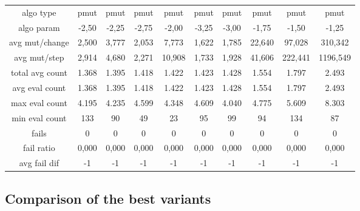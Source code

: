 \begin{tabular}[h]{cccccccccc}
algo type&             pmut&      pmut&      pmut&      pmut&      pmut&      pmut&      pmut&      pmut&      pmut\\
algo param&           -2,50&     -2,25&     -2,75&     -2,00&     -3,25&     -3,00&     -1,75&     -1,50&     -1,25\\
avg mut/change&       2,500&     3,777&     2,053&     7,773&     1,622&     1,785&    22,640&    97,028&   310,342\\
avg mut/step&         2,914&     4,680&     2,271&    10,908&     1,733&     1,928&    41,606&   222,441&  1196,549\\
\hline
total avg count&      1.368&     1.395&     1.418&     1.422&     1.423&     1.428&     1.554&     1.797&     2.493\\
avg eval count&       1.368&     1.395&     1.418&     1.422&     1.423&     1.428&     1.554&     1.797&     2.493\\
max eval count&       4.195&     4.235&     4.599&     4.348&     4.609&     4.040&     4.775&     5.609&     8.303\\
min eval count&         133&        90&        49&        23&        95&        99&        94&       134&        87\\
\hline
fails&                    0&         0&         0&         0&         0&         0&         0&         0&         0\\
fail ratio&           0,000&     0,000&     0,000&     0,000&     0,000&     0,000&     0,000&     0,000&     0,000\\
avg fail dif&            -1&        -1&        -1&        -1&        -1&        -1&        -1&        -1&        -1\\
\end{tabular}


\subsection{Comparison of the best variants}


